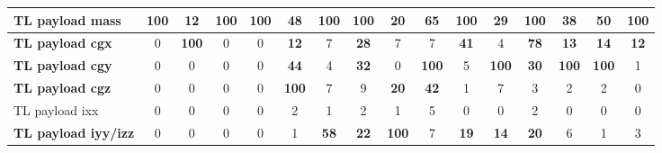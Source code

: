 \begin{table}[H]
\begin{tabular}{|l|c|c|c|c|c|c|c|c|c|c|c|c|c|c|c|}
\hline
\textcolor[rgb]{0.851, 0.373, 0.008}{\textbf{TL payload mass}} & \textcolor[rgb]{0.835, 0.369, 0.000}{\textbf{100}} & \textbf{12} & \textcolor[rgb]{0.835, 0.369, 0.000}{\textbf{100}} & \textcolor[rgb]{0.835, 0.369, 0.000}{\textbf{100}} & \textcolor[rgb]{0.000, 0.620, 0.451}{\textbf{48}} & \textcolor[rgb]{0.835, 0.369, 0.000}{\textbf{100}} & \textcolor[rgb]{0.835, 0.369, 0.000}{\textbf{100}} & \textbf{20} & \textcolor[rgb]{0.000, 0.447, 0.698}{\textbf{65}} & \textcolor[rgb]{0.835, 0.369, 0.000}{\textbf{100}} & \textcolor[rgb]{0.000, 0.620, 0.451}{\textbf{29}} & \textcolor[rgb]{0.835, 0.369, 0.000}{\textbf{100}} & \textcolor[rgb]{0.000, 0.620, 0.451}{\textbf{38}} & \textcolor[rgb]{0.000, 0.447, 0.698}{\textbf{50}} & \textcolor[rgb]{0.835, 0.369, 0.000}{\textbf{100}} \\
\hline
\textcolor[rgb]{0.851, 0.373, 0.008}{\textbf{TL payload \gls{cgx}}} & 0 & \textcolor[rgb]{0.835, 0.369, 0.000}{\textbf{100}} & 0 & 0 & \textbf{12} & 7 & \textcolor[rgb]{0.000, 0.620, 0.451}{\textbf{28}} & 7 & 7 & \textcolor[rgb]{0.000, 0.620, 0.451}{\textbf{41}} & 4 & \textcolor[rgb]{0.000, 0.447, 0.698}{\textbf{78}} & \textbf{13} & \textbf{14} & \textbf{12} \\
\hline
\textcolor[rgb]{0.851, 0.373, 0.008}{\textbf{TL payload \gls{cgy}}} & 0 & 0 & 0 & 0 & \textcolor[rgb]{0.000, 0.620, 0.451}{\textbf{44}} & 4 & \textcolor[rgb]{0.000, 0.620, 0.451}{\textbf{32}} & 0 & \textcolor[rgb]{0.835, 0.369, 0.000}{\textbf{100}} & 5 & \textcolor[rgb]{0.835, 0.369, 0.000}{\textbf{100}} & \textcolor[rgb]{0.000, 0.620, 0.451}{\textbf{30}} & \textcolor[rgb]{0.835, 0.369, 0.000}{\textbf{100}} & \textcolor[rgb]{0.835, 0.369, 0.000}{\textbf{100}} & 1 \\
\hline
\textcolor[rgb]{0.851, 0.373, 0.008}{\textbf{TL payload \gls{cgz}}} & 0 & 0 & 0 & 0 & \textcolor[rgb]{0.835, 0.369, 0.000}{\textbf{100}} & 7 & 9 & \textbf{20} & \textcolor[rgb]{0.000, 0.620, 0.451}{\textbf{42}} & 1 & 7 & 3 & 2 & 2 & 0 \\
\hline
TL payload \gls{ixx} & 0 & 0 & 0 & 0 & 2 & 1 & 2 & 1 & 5 & 0 & 0 & 2 & 0 & 0 & 0 \\
\hline
\textcolor[rgb]{0.851, 0.373, 0.008}{\textbf{TL payload \gls{iyy}/\gls{izz}}} & 0 & 0 & 0 & 0 & 1 & \textcolor[rgb]{0.000, 0.447, 0.698}{\textbf{58}} & \textbf{22} & \textcolor[rgb]{0.835, 0.369, 0.000}{\textbf{100}} & 7 & \textbf{19} & \textbf{14} & \textbf{20} & 6 & 1 & 3 \\
\hline

\end{tabular}%
\end{table}%

